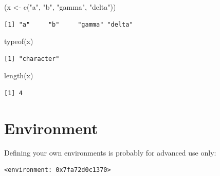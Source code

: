 \documentclass[
]{book}
\newenvironment{Shaded}{\begin{snugshade}}{\end{snugshade}}
\newcommand{\DecValTok}[1]{\textcolor[rgb]{0.00,0.00,0.81}{#1}}
\newcommand{\FunctionTok}[1]{\textcolor[rgb]{0.00,0.00,0.00}{#1}}
\newcommand{\NormalTok}[1]{#1}
\newcommand{\OtherTok}[1]{\textcolor[rgb]{0.56,0.35,0.01}{#1}}
\newcommand{\SpecialCharTok}[1]{\textcolor[rgb]{0.00,0.00,0.00}{#1}}
\newcommand{\StringTok}[1]{\textcolor[rgb]{0.31,0.60,0.02}{#1}}
\begin{document}
\begin{Shaded}
\begin{Highlighting}[]
\NormalTok{(x }\OtherTok{\textless{}{-}} \FunctionTok{c}\NormalTok{(}\StringTok{"a"}\NormalTok{, }\StringTok{"b"}\NormalTok{, }\StringTok{"gamma"}\NormalTok{, }\StringTok{"delta"}\NormalTok{))}
\end{Highlighting}
\end{Shaded}

\begin{verbatim}
[1] "a"     "b"     "gamma" "delta"
\end{verbatim}

\begin{Shaded}
\begin{Highlighting}[]
\FunctionTok{typeof}\NormalTok{(x)}
\end{Highlighting}
\end{Shaded}

\begin{verbatim}
[1] "character"
\end{verbatim}

\begin{Shaded}
\begin{Highlighting}[]
\FunctionTok{length}\NormalTok{(x)}
\end{Highlighting}
\end{Shaded}

\begin{verbatim}
[1] 4
\end{verbatim}

\hypertarget{environment}{%
\section{Environment}\label{environment}}

Defining your own environments is probably for advanced use only:

\begin{Shaded}
\end{Shaded}

\begin{verbatim}
<environment: 0x7fa72d0c1370>
\end{verbatim}
\end{document}
